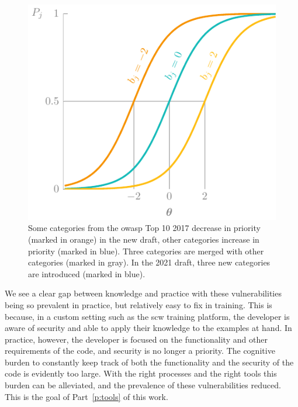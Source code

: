 \begin{figure}
    \centering
    \includegraphics[page=23, width=\textwidth]{03-education/figures/tikzfigures.pdf}
  \caption[OWASP Top 10 2021 draft]{Some categories from the \gls{owasp} Top 10 2017 decrease in priority (marked in orange) in the new draft, other categories increase in priority (marked in blue). Three categories are merged with other categories (marked in gray). In the 2021 draft, three new categories are introduced (marked in blue).}
  \label{fig:newowasptop10} 
\end{figure}


We see a clear gap between knowledge and practice with these vulnerabilities being so prevalent in practice, but relatively easy to fix in training.
This is because, in a custom setting such as the \gls{scw} training platform, the developer is aware of security and able to apply their knowledge to the examples at hand.
In practice, however, the developer is focused on the functionality and other requirements of the code, and security is no longer a priority.
The cognitive burden to constantly keep track of both the functionality and the security of the code is evidently too large.
With the right processes and the right tools this burden can be alleviated, and the prevalence of these vulnerabilities reduced.
This is the goal of Part~\ref{p:tools} of this work.


